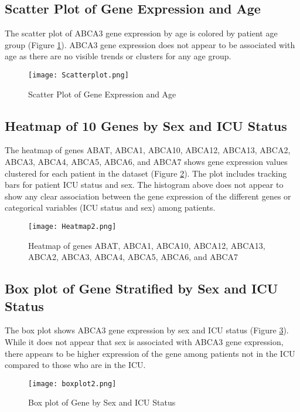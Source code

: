 \documentclass{article}
\begin{document}
\subsection{Scatter Plot of Gene Expression and Age}
\hspace{\parindent}The scatter plot of ABCA3 gene expression by age is colored by patient age group (Figure \ref{fig:scatterplot}). ABCA3 gene expression does not appear to be associated with age as there are no visible trends or clusters for any age group. 
\begin{figure}
    \centering
    \texttt{[image: Scatterplot.png]}
    \caption{Scatter Plot of Gene Expression and Age}
    \label{fig:scatterplot}
\end{figure}


\subsection{Heatmap of 10 Genes by Sex and ICU Status}
\hspace{\parindent} The heatmap of genes ABAT, ABCA1, ABCA10, ABCA12, ABCA13, ABCA2, ABCA3, ABCA4, ABCA5, ABCA6, and ABCA7 shows gene expression values clustered for each patient in the dataset (Figure \ref{fig:heatmap}). The plot includes tracking bars for patient ICU status and sex. The histogram above does not appear to show any clear association between the gene expression of the different genes or categorical variables (ICU status and sex) among patients.

\begin{figure}
    \centering
    \texttt{[image: Heatmap2.png]}
    \caption{Heatmap of genes ABAT, ABCA1, ABCA10, ABCA12, ABCA13, ABCA2, ABCA3, ABCA4, ABCA5, ABCA6, and ABCA7 }
    \label{fig:heatmap}
\end{figure}

\subsection{Box plot of Gene Stratified by Sex and ICU Status}
    \hspace{\parindent}The box plot shows ABCA3 gene expression by sex and ICU status (Figure \ref{fig:boxplot}). While it does not appear that sex is associated with ABCA3 gene expression, there appears to be higher expression of the gene among patients not in the ICU compared to those who are in the ICU.
      \begin{figure}
            \centering
            \texttt{[image: boxplot2.png]}
            \caption{Box plot of Gene by Sex and ICU Status}
            \label{fig:boxplot}
        \end{figure}
  
\end{document}
